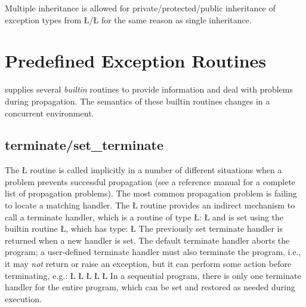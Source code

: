 \documentclass[openright,twoside]{report}
\begin{document}
Multiple inheritance is allowed for private/protected/public inheritance of exception types from \LGinlinetrue\LGbegin\lgrinde\L{}\endlgrinde\LGend{}/\LGinlinetrue\LGbegin\lgrinde\L{}\endlgrinde\LGend{} for the same reason as single inheritance.


\section{Predefined Exception Routines}

\CC supplies several \emph{builtin} routines to provide information and deal with problems during propagation.
The semantics of these builtin routines changes in a concurrent environment.


\subsection{\texorpdfstring{{\BGfont terminate}/{\BGfont set\_terminate}}{terminate/set\_terminate}}
\label{s:set_terminate}

The \LGinlinetrue\LGbegin\lgrinde\L{}\endlgrinde\LGend{} routine is called implicitly in a number of different situations when a problem prevents successful propagation (see a \CC reference manual for a complete list of propagation problems).
The most common propagation problem is failing to locate a matching handler.
The \LGinlinetrue\LGbegin\lgrinde\L{}\endlgrinde\LGend{} routine provides an indirect mechanism to call a terminate handler, which is a routine of type \LGinlinetrue\LGbegin\lgrinde\L{}\endlgrinde\LGend{}:
\LGinlinefalse\LGbegin\lgrinde
\L{}
\endlgrinde\LGend
and is set using the builtin routine \LGinlinetrue\LGbegin\lgrinde\L{}\endlgrinde\LGend{}, which has type:
\LGinlinefalse\LGbegin\lgrinde
\L{}
\endlgrinde\LGend
The previously set terminate handler is returned when a new handler is set.
The default terminate handler aborts the program;
a user-defined terminate handler must also terminate the program, i.e., it may \emph{not} return or raise an exception, but it can perform some action before terminating, e.g.:
\LGinlinefalse\LGbegin\lgrinde
\L{}
\L{\LB{}}
\CE{}\L{\LB{}}
\CE{}\L{\LB{\}}}
\L{}
\endlgrinde\LGend
In a sequential program, there is only one terminate handler for the entire program, which can be set and restored as needed during execution.
\end{document}
